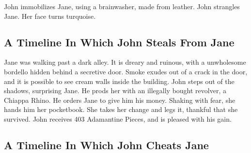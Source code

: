 \documentclass{article}
\begin{document}
John immobilizes Jane, using a brainwasher, made from leather.
John strangles Jane.
Her face turns turquoise.
\subsection{A Timeline In Which John Steals From Jane}


Jane was walking past a dark alley.
It is dreary and ruinous, with a unwholesome bordello hidden behind a secretive door.
Smoke exudes out of a crack in the door, and it is possible to see cream walls inside the building.
John steps out of the shadows, surprising Jane.
He prods her with an illegally bought revolver, a Chiappa Rhino.
He orders Jane to give him his money.
Shaking with fear, she hands him her pocketbook.
She takes her change and legs it, thankful that she survived.
John receives 403 Adamantine Pieces, and is pleased with his gain.
\subsection{A Timeline In Which John Cheats Jane}
\end{document}
